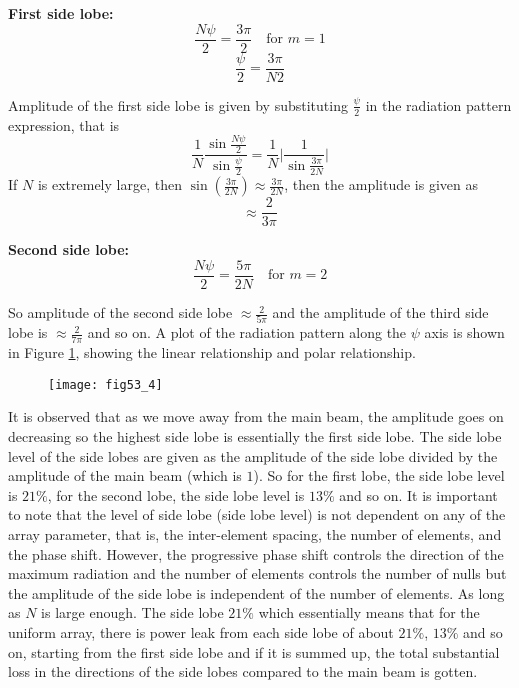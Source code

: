 \textbf{First side lobe:}
$$\frac{N\psi}{2} = \frac{3\pi}{2} \quad \text{for $m=1$} $$
$$ \frac{\psi}{2} = \frac{3\pi}{N2} $$

Amplitude of the first side lobe is given by substituting $\frac{\psi}{2}$ in the radiation pattern expression, that is
$$\frac{1}{N} \frac{\sin{\frac{N\psi}{2}}}{\sin{\frac{\psi}{2}}} = \frac{1}{N} |{\frac{1}{\sin{\frac{3\pi}{2N}}} |}   $$
If $N$ is extremely large, then $\sin{(\frac{3\pi}{2N})} \approx  \frac{3\pi}{2N}$, then the amplitude is given as $$\approx \frac{2}{3\pi}$$


\textbf{Second side lobe:}
$$\frac{N\psi}{2} = \frac{5\pi}{2N} \quad \text{for $m=2$} $$

So amplitude of the second side lobe  $\approx \frac{2}{5\pi}$ and the amplitude of the third side lobe is $\approx \frac{2}{7\pi}$ and so on. A plot of the radiation pattern along the $\psi$ axis is shown in Figure \ref{53.4}, showing the linear relationship and polar relationship.

\begin{figure}
	\centering
	\texttt{[image: fig53\_4]}
	\caption{}
	\label{53.4}
	
\end{figure}


It is observed that as we move away from the main beam,  the amplitude goes on decreasing so the highest side lobe is essentially the first side lobe. The side lobe level of the side lobes are given as the amplitude of the side lobe divided by the amplitude of the main beam (which is $1$). So for the first lobe, the side lobe level is $21\%$, for the second lobe, the side lobe level is $13\%$ and so on. It is important to note that the level of side lobe (side lobe level) is not dependent on any of the array parameter, that is, the inter-element spacing, the number of elements, and the phase shift. However, the progressive phase shift controls the direction of the maximum radiation and the number of elements controls the number of nulls but the amplitude of the side lobe is independent of the number of elements. As long as $N$ is large enough. The side lobe $21\%$ which essentially means that for the uniform array, there is power leak  from each side lobe of about $21\%$, $13\%$ and so on, starting from the first side lobe and if it is summed up, the total substantial loss in the directions of the side lobes compared to the main beam is gotten.